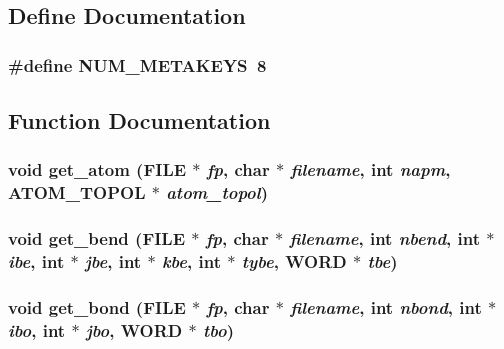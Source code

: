 \subsection{Define Documentation}
\subsubsection{\setlength{\rightskip}{0pt plus 5cm}\#define NUM\_\-METAKEYS~8}\label{md__getmols_8c_725ce353532cbed7581971e1be6eb2da}




\subsection{Function Documentation}
\subsubsection{\setlength{\rightskip}{0pt plus 5cm}void get\_\-atom (FILE $\ast$ {\em fp}, char $\ast$ {\em filename}, int {\em napm}, {\bf ATOM\_\-TOPOL} $\ast$ {\em atom\_\-topol})}\label{md__getmols_8c_7411f824e955c50a21ca6213af8c64ba}


\subsubsection{\setlength{\rightskip}{0pt plus 5cm}void get\_\-bend (FILE $\ast$ {\em fp}, char $\ast$ {\em filename}, int {\em nbend}, int $\ast$ {\em ibe}, int $\ast$ {\em jbe}, int $\ast$ {\em kbe}, int $\ast$ {\em tybe}, {\bf WORD} $\ast$ {\em tbe})}\label{md__getmols_8c_ddef324788d34574bc157b9f42e92d14}


\subsubsection{\setlength{\rightskip}{0pt plus 5cm}void get\_\-bond (FILE $\ast$ {\em fp}, char $\ast$ {\em filename}, int {\em nbond}, int $\ast$ {\em ibo}, int $\ast$ {\em jbo}, {\bf WORD} $\ast$ {\em tbo})}\label{md__getmols_8c_4db9ff3371cf5cfe84da06a5ae94aa16}


